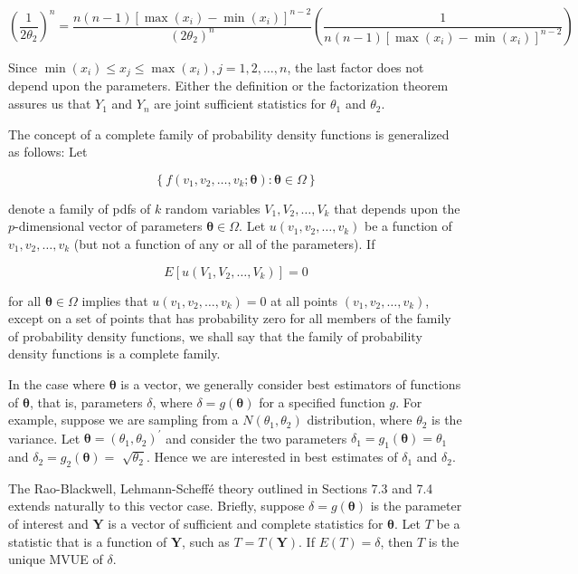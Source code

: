 $$
\left(\frac{1}{2 \theta_{2}}\right)^{n}=\frac{n(n-1)\left[\max \left(x_{i}\right)-\min \left(x_{i}\right)\right]^{n-2}}{\left(2 \theta_{2}\right)^{n}}\left(\frac{1}{n(n-1)\left[\max \left(x_{i}\right)-\min \left(x_{i}\right)\right]^{n-2}}\right)
$$

Since $\min \left(x_{i}\right) \leq x_{j} \leq \max \left(x_{i}\right), j=1,2, \ldots, n$, the last factor does not depend upon the parameters. Either the definition or the factorization theorem assures us that $Y_{1}$ and $Y_{n}$ are joint sufficient statistics for $\theta_{1}$ and $\theta_{2}$.

The concept of a complete family of probability density functions is generalized as follows: Let

$$
\left\{f\left(v_{1}, v_{2}, \ldots, v_{k} ; \boldsymbol{\theta}\right): \boldsymbol{\theta} \in \Omega\right\}
$$

denote a family of pdfs of $k$ random variables $V_{1}, V_{2}, \ldots, V_{k}$ that depends upon the $p$-dimensional vector of parameters $\boldsymbol{\theta} \in \Omega$. Let $u\left(v_{1}, v_{2}, \ldots, v_{k}\right)$ be a function of $v_{1}, v_{2}, \ldots, v_{k}$ (but not a function of any or all of the parameters). If

$$
E\left[u\left(V_{1}, V_{2}, \ldots, V_{k}\right)\right]=0
$$

for all $\boldsymbol{\theta} \in \Omega$ implies that $u\left(v_{1}, v_{2}, \ldots, v_{k}\right)=0$ at all points $\left(v_{1}, v_{2}, \ldots, v_{k}\right)$, except on a set of points that has probability zero for all members of the family of probability density functions, we shall say that the family of probability density functions is a complete family.

In the case where $\boldsymbol{\theta}$ is a vector, we generally consider best estimators of functions of $\boldsymbol{\theta}$, that is, parameters $\delta$, where $\delta=g(\boldsymbol{\theta})$ for a specified function $g$. For example, suppose we are sampling from a $N\left(\theta_{1}, \theta_{2}\right)$ distribution, where $\theta_{2}$ is the variance. Let $\boldsymbol{\theta}=\left(\theta_{1}, \theta_{2}\right)^{\prime}$ and consider the two parameters $\delta_{1}=g_{1}(\boldsymbol{\theta})=\theta_{1}$ and $\delta_{2}=g_{2}(\boldsymbol{\theta})=$ $\sqrt{\theta_{2}}$. Hence we are interested in best estimates of $\delta_{1}$ and $\delta_{2}$.

The Rao-Blackwell, Lehmann-Scheffé theory outlined in Sections 7.3 and 7.4 extends naturally to this vector case. Briefly, suppose $\delta=g(\boldsymbol{\theta})$ is the parameter of interest and $\mathbf{Y}$ is a vector of sufficient and complete statistics for $\boldsymbol{\theta}$. Let $T$ be a statistic that is a function of $\mathbf{Y}$, such as $T=T(\mathbf{Y})$. If $E(T)=\delta$, then $T$ is the unique MVUE of $\delta$.

